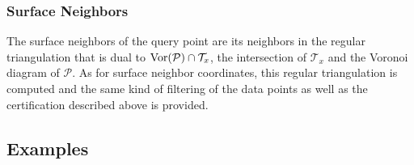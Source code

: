 \subsubsection{Surface Neighbors}

The surface neighbors of the query point are its neighbors in the
regular triangulation that is dual to ${\rm Vor}(\mathcal{P}) \cap
\mathcal{T}_x$, the intersection of $\mathcal{T}_x$ and the Voronoi
diagram of $\mathcal{P}$. As for surface neighbor coordinates, this
regular triangulation is computed and the same kind of filtering of
the data points as well as the certification described above is
provided.


\subsection{Examples}

